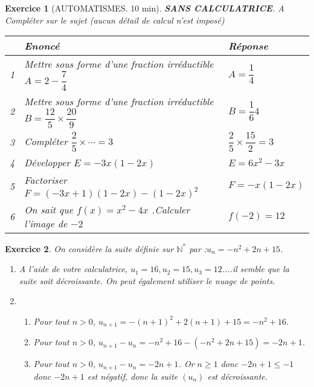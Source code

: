 \documentclass[10pt,a4paper]{article}
\def\N{{\mathbb N}}
\renewcommand{\arraystretch}{1}
\theoremstyle{break}
\newtheorem{exo}{Exercice}
\begin{document}
\newpage
\begin{exo}[AUTOMATISMES. 10 min] 
	\textbf{SANS CALCULATRICE}. A Compléter sur le sujet (aucun détail de calcul n'est imposé)\\
	{\renewcommand{\arraystretch}{2}
		\begin{tabular}{|p{1cm}|p{10cm}|p{5.5cm}| }
			\hline
			&Enoncé&Réponse\\
			\hline
			1&Mettre sous forme d'une fraction irréductible $A= 2-\dfrac74$&$A=\dfrac14$\\
			\hline
			2&Mettre sous forme d'une fraction irréductible $B= \dfrac{12}5\times\dfrac{20}9$&$B=\dfrac16{4}$\\
			\hline
			3&Compléter $\dfrac25\times \cdots=3$&$\dfrac25\times \dfrac{15}{2}=3$\\
			\hline
			4&Développer $E=-3x(1-2x)$&$E=6x^2-3x$\\
			\hline
			5&Factoriser $F=(-3x+1)(1-2x)-(1-2x)^2$&$F=-x(1-2x)$\\
			\hline
			6&On sait que $f(x)=x^2-4x$ .Calculer l'image de $-2$&$f(-2)=12$\\
			\hline
		\end{tabular}}
		
	\end{exo}
	\begin{exo}
		On considère la suite définie sur $\N^*$ par  :$u_n= -n^2+2n+15$.
		\begin{enumerate}
			\item A l'aide de votre calculatrice, $u_1=16, u_2=15, u_3=12$....il semble que la suite soit décroissante. On peut également utiliser le nuage de points.
			\item 
			\begin{enumerate}
				\item Pour tout $n>0$,  $u_{n+1}=-(n+1)^2+2(n+1)+15=-n^2+16$.
				\item Pour tout $n>0$,  $u_{n+1}-u_n=-n^2+16-(-n^2+2n+15)=-2n+1$. 
				\item Pour tout $n>0$,  $u_{n+1}-u_n=-2n+1$. Or $n \geq 1$ donc $-2n+1 \leq -1$ donc $-2n+1$ est négatif, donc la suite $(u_n)$ est décroissante.
			\end{enumerate}
		\end{enumerate}
	\end{exo}
\end{document}
